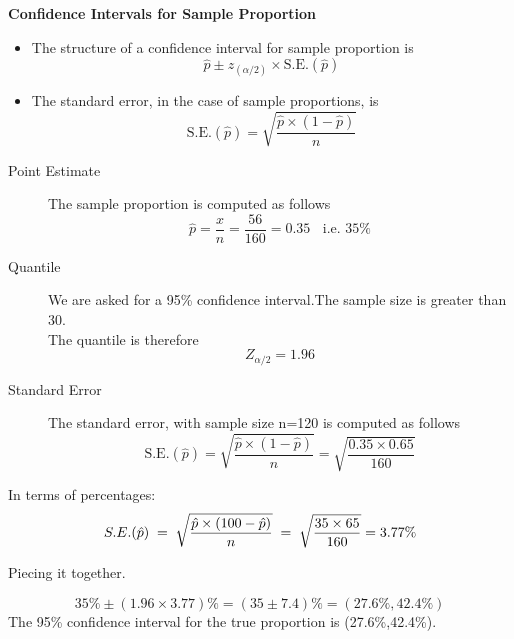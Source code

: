 \documentclass[a4paper,12pt]{article}
\begin{document}
\begin{framed}
	\textbf{Confidence Intervals for Sample Proportion}
	
	\begin{itemize}
		\item The structure of a confidence interval for sample proportion is 
		\[ \hat{p} \pm z_{(\alpha/2)} \times \mbox{S.E.}(\hat{p})\]
		
		\item The standard error, in the case of sample proportions, is
		\[ \mbox{S.E.}(\hat{p}) = \sqrt{\frac{\hat{p}\times (1-\hat{p})}{n}}\]
		
	\end{itemize}
\end{framed}
\medskip
\begin{framed}
\begin{description}
	\item[Point Estimate] The sample proportion is computed as follows
	\[ \hat{p} = \frac{x}{n} = \frac{56}{160} = 0.35 \;\; \mbox{ i.e. }35\%\]
	\item[Quantile] We are asked for a 95\% confidence interval.The sample size is greater than 30.\\ \noindent The quantile is therefore
	\[ Z_{\alpha/2} =1.96\]
	\item[Standard Error] The standard error, with sample size n=120 is computed as follows
	\[ \mbox{S.E.}(\hat{p}) = \sqrt{\frac{\hat{p} \times (1-\hat{p})}{n}} =  \sqrt{\frac{0.35 \times 0.65}{160}}\]
	\end{description}
	\end{framed}
\noindent In terms of percentages:
\[
S.E. (\hat{p}) \;=\; \sqrt{\frac{\hat{p} \times (100-\hat{p})}{n}} \;=\; \sqrt{ {35 \times 65 \over 160 }} =  3.77\%
\] 

\medskip
\noindent Piecing it together.

\[
35\% \pm (1.96 \times 3.77) \%  = (35 \pm7.4) \% = (27.6\%,42.4\%)
\]
\smallskip
\noindent The 95\% confidence interval for the true proportion is (27.6\%,42.4\%).
\end{document}
